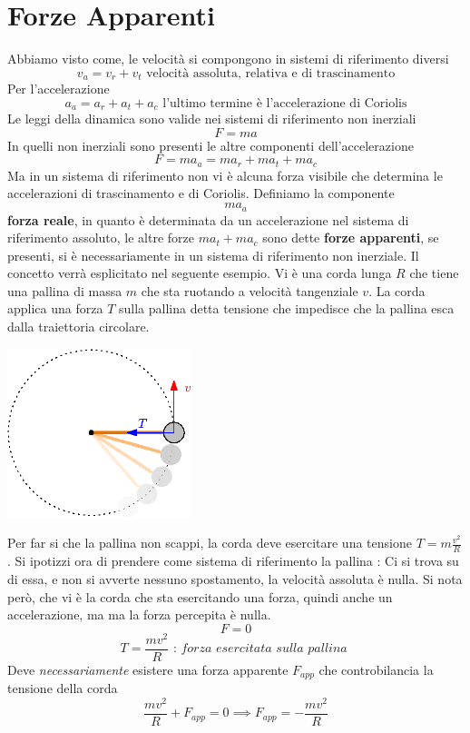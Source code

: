\documentclass[10pt, letterpaper]{report}
\begin{document}
\section{Forze Apparenti}
Abbiamo visto come, le velocità si compongono in sistemi di riferimento diversi 
$$ v_a=v_r+v_t \text{ velocità assoluta, relativa e di trascinamento}$$
Per l'accelerazione 
$$ a_a=a_r+a_t+a_c \text{ l'ultimo termine è l'accelerazione di Coriolis}$$
Le leggi della dinamica sono valide nei sistemi di riferimento non inerziali 
$$ F=ma$$
In quelli non inerziali sono presenti le altre componenti dell'accelerazione
$$ F=ma_a=ma_r+ma_t+ma_c$$
Ma in un sistema di riferimento non vi è alcuna forza visibile che determina le accelerazioni 
di trascinamento e di Coriolis. Definiamo la componente 
$$ ma_a$$ 
\textbf{forza reale}, in quanto è determinata da un accelerazione nel sistema di riferimento assoluto, le 
altre forze $ma_t+ma_c$ sono dette \textbf{forze apparenti}, se presenti, si è necessariamente in un 
sistema di riferimento non inerziale. Il concetto verrà esplicitato nel seguente esempio.\acc 
Vi è una corda lunga $R$ che tiene una pallina di massa $m$ che sta ruotando a velocità tangenziale $v$. La 
corda applica una forza $T$ sulla pallina detta tensione che impedisce che la pallina esca dalla traiettoria circolare.\begin{center}
    \includegraphics[width=0.4\textwidth]{images/forzaCent.eps}
\end{center}
Per far si che la pallina non scappi, la corda deve esercitare una tensione $T=m\frac{v^2}{R}$. Si ipotizzi ora 
di prendere come sistema di riferimento la pallina : Ci si trova su di essa, e non si avverte nessuno spostamento, 
la velocità assoluta è nulla. Si nota però, che vi è la corda che sta esercitando una forza, quindi anche un accelerazione, ma 
ma la forza percepita è nulla. 
$$ F=0$$
$$ T = \frac{mv^2}{R}\textit{ : forza esercitata sulla pallina }$$
Deve \textit{necessariamente} esistere una forza apparente $F_{app}$ che controbilancia la tensione della corda 
$$ \frac{mv^2}{R} + F_{app} = 0 \implies F_{app}=-\frac{mv^2}{R} $$
\end{document}
